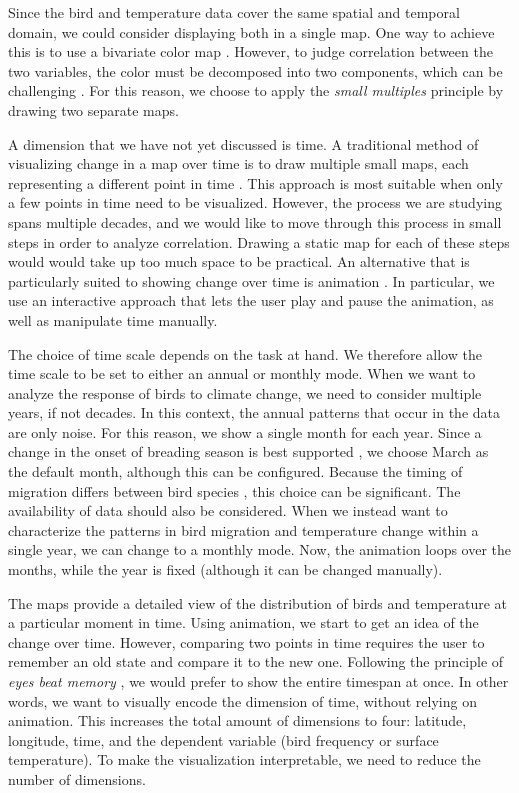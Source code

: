\documentclass[journal]{vgtc}                %
\begin{document}
Since the bird and temperature data cover the same spatial and temporal domain, we could consider displaying both in a single map. One way to achieve this is to use a bivariate color map \cite{brewer99color,rheingans2000task}. However, to judge correlation between the two variables, the color must be decomposed into two components, which can be challenging \cite{rheingans2000task}. For this reason, we choose to apply the \emph{small multiples} principle \cite{munzner2014visualization} by drawing two separate maps.

A dimension that we have not yet discussed is time. A traditional method of visualizing change in a map over time is to draw multiple small maps, each representing a different point in time \cite{bertin1983semiology}. This approach is most suitable when only a few points in time need to be visualized. However, the process we are studying spans multiple decades, and we would like to move through this process in small steps in order to analyze correlation. Drawing a static map for each of these steps would would take up too much space to be practical. An alternative that is particularly suited to showing change over time is animation \cite{peterson1995interactive}. In particular, we use an interactive approach that lets the user play and pause the animation, as well as manipulate time manually.

The choice of time scale depends on the task at hand. We therefore allow the time scale to be set to either an annual or monthly mode. When we want to analyze the response of birds to climate change, we need to consider multiple years, if not decades. In this context, the annual patterns that occur in the data are only noise. For this reason, we show a single month for each year. Since a change in the onset of breading season is best supported \cite{cotton2003avian,jenni2003timing}, we choose March as the default month, although this can be configured. Because the timing of migration differs between bird species \cite{jenni2003timing}, this choice can be significant. The availability of data should also be considered. When we instead want to characterize the patterns in bird migration and temperature change within a single year, we can change to a monthly mode. Now, the animation loops over the months, while the year is fixed (although it can be changed manually).

The maps provide a detailed view of the distribution of birds and temperature at a particular moment in time. Using animation, we start to get an idea of the change over time. However, comparing two points in time requires the user to remember an old state and compare it to the new one. Following the principle of \emph{eyes beat memory} \cite{munzner2014visualization}, we would prefer to show the entire timespan at once. In other words, we want to visually encode the dimension of time, without relying on animation. This increases the total amount of dimensions to four: latitude, longitude, time, and the dependent variable (bird frequency or surface temperature). To make the visualization interpretable, we need to reduce the number of dimensions.
\end{document}
